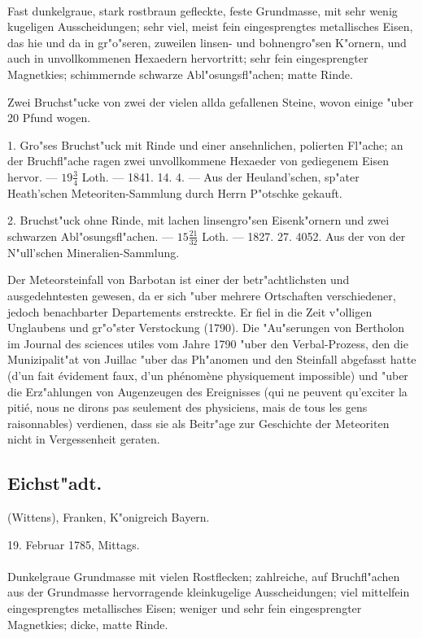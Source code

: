 \documentclass[a4paper, 11pt, oneside, polutonikogreek, german]{article}
\begin{document}
\paragraph{}
Fast dunkelgraue, stark rostbraun gefleckte, feste Grundmasse, mit sehr wenig kugeligen Ausscheidungen; sehr viel, meist fein eingesprengtes metallisches Eisen, das hie und da in gr"o"seren, zuweilen linsen- und bohnengro"sen K"ornern, und auch in unvollkommenen Hexaedern hervortritt; sehr fein eingesprengter Magnetkies; schimmernde schwarze Abl"osungsfl"achen; matte Rinde.

Zwei Bruchst"ucke von zwei der vielen allda gefallenen Steine, wovon einige "uber 20 Pfund wogen.

1. Gro"ses Bruchst"uck mit Rinde und einer ansehnlichen, polierten Fl"ache; an der Bruchfl"ache ragen zwei unvollkommene Hexaeder von gediegenem Eisen hervor. --- $19\frac{3}{4}$ Loth. --- 1841. 14. 4. --- Aus der Heuland'schen, sp"ater Heath'schen Meteoriten-Sammlung durch Herrn P"otschke gekauft.

2. Bruchst"uck ohne Rinde, mit lachen linsengro"sen Eisenk"ornern und zwei schwarzen Abl"osungsfl"achen. --- $15\frac{21}{32}$ Loth. --- 1827. 27. 4052. Aus der von der N"ull'schen Mineralien-Sammlung.

Der Meteorsteinfall von Barbotan ist einer der betr"achtlichsten und ausgedehntesten gewesen, da er sich "uber mehrere Ortschaften verschiedener, jedoch benachbarter Departements erstreckte. Er fiel in die Zeit v"olligen Unglaubens und gr"o"ster Verstockung (1790). Die "Au"serungen von Bertholon im Journal des sciences utiles vom Jahre 1790 "uber den Verbal-Prozess, den die Munizipalit"at von Juillac "uber das Ph"anomen und den Steinfall abgefasst hatte (d'un fait évidement faux, d'un phénomène physiquement impossible) und "uber die Erz"ahlungen von Augenzeugen des Ereignisses (qui ne peuvent qu'exciter la pitié, nous ne dirons pas seulement des physiciens, mais de tous les gens raisonnables) verdienen, dass sie als Beitr"age zur Geschichte der Meteoriten nicht in Vergessenheit geraten.
\subsection{Eichst"adt.}
\begin{center}
\small
(Wittens), Franken, K"onigreich Bayern.

19. Februar 1785, Mittags.
\end{center}
\paragraph{}
Dunkelgraue Grundmasse mit vielen Rostflecken; zahlreiche, auf Bruchfl"achen aus der Grundmasse hervorragende kleinkugelige Ausscheidungen; viel mittelfein eingesprengtes metallisches Eisen; weniger und sehr fein eingesprengter Magnetkies; dicke, matte Rinde.
\end{document}
